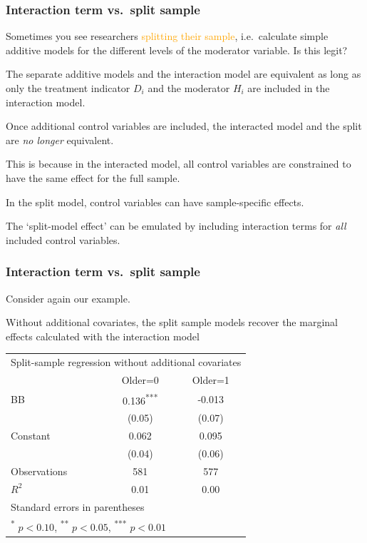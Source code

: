 \documentclass[12pt,english,dvipsnames,aspectratio=169,handout]{beamer}\usepackage[]{graphicx}\usepackage[]{xcolor}
\begin{document}
\begin{frame}
  \frametitle{Interaction term vs.\ split sample}
\footnotesize

Sometimes you see researchers \textcolor{orange}{splitting their sample}, i.e.\ calculate simple additive models for the different levels of the moderator variable. Is this legit?

The separate additive models and the interaction model are equivalent as long as only the treatment indicator $D_i$ and the moderator $H_i$ are included in the interaction model.

Once additional control variables are included, the interacted model and the split are \emph{no longer} equivalent.

This is because in the interacted model, all control variables are constrained to have the same effect for the full sample.

In the split model, control variables can have sample-specific effects.

The `split-model effect' can be emulated by including interaction terms for \emph{all} included control variables.

\end{frame}



\begin{frame}
  \frametitle{Interaction term vs.\ split sample}
\footnotesize
Consider again our example.

Without additional covariates, the split sample models recover the marginal effects calculated with the interaction model
\vspace{5mm}

\scriptsize
\centering
\begin{tabular}{l*{2}{c}}
\toprule
\multicolumn{3}{c}{Split-sample regression without additional covariates}\\
                & Older=0 &         Older=1 \\
\midrule
BB          &    0.136\textsuperscript{***}&   -0.013         \\
                &   (0.05)         &   (0.07)         \\
Constant        &    0.062         &    0.095         \\
                &   (0.04)         &   (0.06)         \\
\midrule
Observations    &      581         &      577         \\
\(R^{2}\)       &     0.01         &     0.00         \\
\bottomrule
\multicolumn{3}{l}{ Standard errors in parentheses}\\
\multicolumn{3}{l}{ \textsuperscript{*} \(p<0.10\), \textsuperscript{**} \(p<0.05\), \textsuperscript{***} \(p<0.01\)}\\
\end{tabular}

\end{frame}
\end{document}
